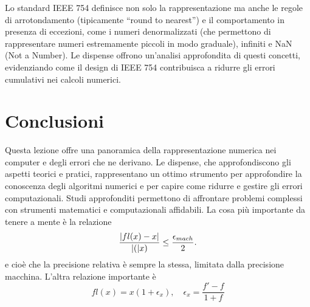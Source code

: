 \documentclass[letterpaper,12pt]{article}
\DeclarePairedDelimiter{\abs}{\lvert}{\rvert} %
\begin{document}
        Lo standard IEEE 754 definisce non solo la rappresentazione ma anche le regole di arrotondamento (tipicamente ``round to nearest'') e il comportamento in presenza di eccezioni, come i numeri denormalizzati (che permettono di rappresentare numeri estremamente piccoli in modo graduale), infiniti e NaN (Not a Number). Le dispense offrono un’analisi approfondita di questi concetti, evidenziando come il design di IEEE 754 contribuisca a ridurre gli errori cumulativi nei calcoli numerici.

\section{Conclusioni}
Questa lezione offre una panoramica della rappresentazione numerica nei computer e degli errori che ne derivano. Le dispense, che approfondiscono gli aspetti teorici e pratici, rappresentano un ottimo strumento per approfondire la conoscenza degli algoritmi numerici e per capire come ridurre e gestire gli errori computazionali. Studi approfonditi permettono di affrontare problemi complessi con strumenti matematici e computazionali affidabili.
La cosa più importante da tenere a mente è la relazione 
    \[
        \frac{\abs{fl(x) - x}}{\abs(x)} \leq \frac{\epsilon_{mach}}{2}.
    \]
e cioè che la precisione relativa è sempre la stessa, limitata dalla precisione macchina.
L'altra relazione importante è
    \[
        fl(x) = x(1+\epsilon_x), \quad {\epsilon_x} = \frac{f'-f}{1+f} 
    \]
\end{document}
